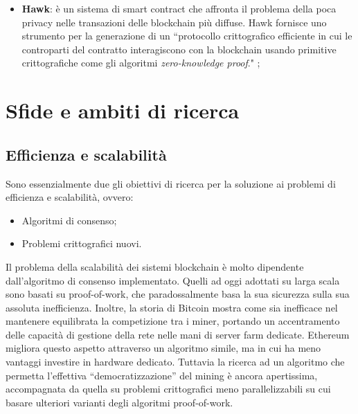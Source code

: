 \begin{itemize}
            \item \textbf{Hawk}: è un sistema di smart contract che affronta il problema della poca privacy nelle transazioni delle blockchain più diffuse. Hawk fornisce uno strumento per la generazione di un ``protocollo crittografico efficiente in cui le controparti del contratto interagiscono con la blockchain usando primitive crittografiche come gli algoritmi \emph{zero-knowledge proof}." \cite{hawk};
        \end{itemize}

\section{Sfide e ambiti di ricerca}
    \subsection{Efficienza e scalabilità}
        Sono essenzialmente due gli obiettivi di ricerca per la soluzione ai problemi di efficienza e scalabilità, ovvero:
        \begin{itemize}
            \item Algoritmi di consenso;
            \item Problemi crittografici nuovi.
        \end{itemize}
        Il problema della scalabilità dei sistemi blockchain è molto dipendente dall'algoritmo di consenso implementato. Quelli ad oggi adottati su larga scala sono basati su proof-of-work, che paradossalmente basa la sua sicurezza sulla sua assoluta inefficienza. Inoltre, la storia di Bitcoin mostra come sia inefficace nel mantenere equilibrata la competizione tra i miner, portando un accentramento delle capacità di gestione della rete nelle mani di server farm dedicate. Ethereum migliora questo aspetto attraverso un algoritmo simile, ma in cui ha meno vantaggi investire in hardware dedicato. Tuttavia la ricerca ad un algoritmo che permetta l'effettiva ``democratizzazione'' del mining è ancora apertissima, accompagnata da quella su problemi crittografici meno parallelizzabili su cui basare ulteriori varianti degli algoritmi proof-of-work.
        
